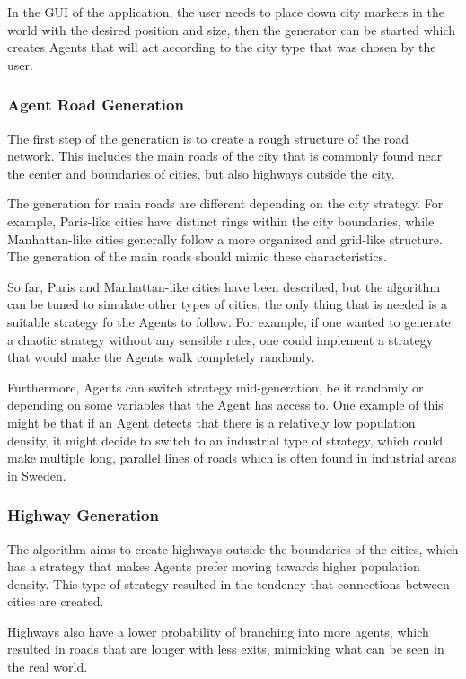 In the GUI of the application, the user needs to place down city markers in the
world with the desired position and size, then the generator can be started
which creates Agents that will act according to the city type that was chosen by
the user.

\subsubsection{Agent Road Generation}
The first step of the generation is to create a rough structure of the road
network. This includes the main roads of the city that is commonly found near
the center and boundaries of cities, but also highways outside the city.

The generation for main roads are different depending on the city strategy. For
example, Paris-like cities have distinct rings within the city boundaries, while
Manhattan-like cities generally follow a more organized and grid-like structure.
The generation of the main roads should mimic these characteristics.

So far, Paris and Manhattan-like cities have been described, but the algorithm
can be tuned to simulate other types of cities, the only thing that is needed is
a suitable strategy fo the Agents to follow. For example, if one wanted to
generate a chaotic strategy without any sensible rules, one could implement a
strategy that would make the Agents walk completely randomly.

Furthermore, Agents can switch strategy mid-generation, be it randomly or
depending on some variables that the Agent has access to. One example of this
might be that if an Agent detects that there is a relatively low population
density, it might decide to switch to an industrial type of strategy, which
could make multiple long, parallel lines of roads which is often found in
industrial areas in Sweden.

\subsubsection{Highway Generation}
The algorithm aims to create highways outside the boundaries of the cities,
which has a strategy that makes Agents prefer moving towards higher population
density. This type of strategy resulted in the tendency that connections between
cities are created.

Highways also have a lower probability of branching into more agents, which
resulted in roads that are longer with less exits, mimicking what can be seen in
the real world.
